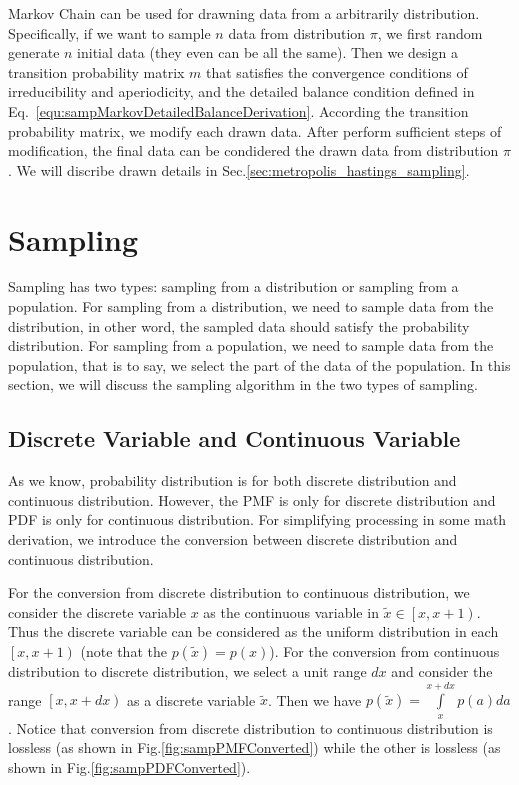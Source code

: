 \documentclass[runningheads,openany]{xhlPaper}
\begin{document}
Markov Chain can be used for drawning data from a arbitrarily distribution. 
Specifically, if we want to sample $n$ data from distribution $\pi$, we first random generate $n$ initial data (they even can be all the same).
Then we design a transition probability matrix $m$ that satisfies the convergence conditions of irreducibility and aperiodicity, and the detailed balance condition defined in Eq.~\ref{equ:sampMarkovDetailedBalanceDerivation}.
According the transition probability matrix, we modify each drawn data.
After perform sufficient steps of modification, the final data can be condidered the drawn data from distribution $\pi$.
We will discribe drawn details in Sec.\ref{sec:metropolis_hastings_sampling}.




\section{Sampling}
Sampling has two types: sampling from a distribution or sampling from a population. For sampling from a distribution, we need to sample data from the distribution, in other word, the sampled data should satisfy the probability distribution. For sampling from a population, we need to sample data from the population, that is to say, we select the part of the data of the population. In this section, we will discuss the sampling algorithm in the two types of sampling.

\subsection{Discrete Variable and Continuous Variable}
As we know, probability distribution is for both discrete distribution and continuous distribution. However, the PMF is only for discrete distribution and PDF is only for continuous distribution. For simplifying processing in some math derivation, we introduce the conversion between discrete distribution and continuous distribution.

For the conversion from discrete distribution to continuous distribution, we consider the discrete variable $x$ as the continuous variable in $\tilde x \in \left[x, x + 1\right)$. Thus the discrete variable can be considered as the uniform distribution in each $\left[x, x + 1\right)$ (note that the $p\left(\tilde{x}\right) = p\left(x\right)$). 
For the conversion from continuous distribution to discrete distribution, we select a unit range $dx$ and consider the range $\left[x, x + dx\right)$ as a discrete variable $\tilde{x}$. Then we have $p\left(\tilde{x}\right) = \int\limits_x^{x + dx} {p\left( a \right)da} $. 
Notice that conversion from discrete distribution to continuous distribution is lossless (as shown in Fig.\ref{fig:sampPMFConverted}) while the other is lossless (as shown in Fig.\ref{fig:sampPDFConverted}).
\end{document}

